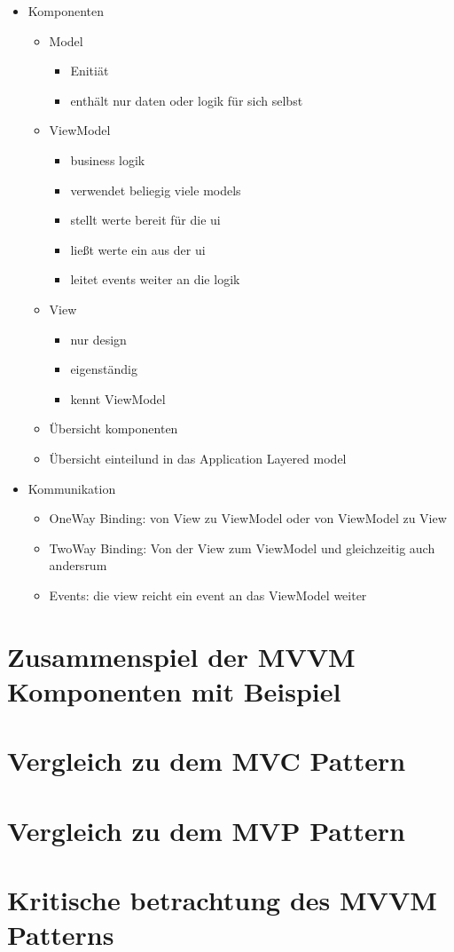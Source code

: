 \documentclass[titlepage=false,12pt]{scrreprt}
\begin{document}
	\begin{itemize}
		\item Komponenten
		\begin{itemize}
			\item Model
			\begin{itemize}
				\item Enitiät
				\item enthält nur daten oder logik für sich selbst
			\end{itemize}
			\item ViewModel
			\begin{itemize}
				\item business logik
				\item verwendet beliegig viele models
				\item stellt werte bereit für die ui
				\item ließt werte ein aus der ui
				\item leitet events weiter an die logik
			\end{itemize}
			\item View
			\begin{itemize}
				\item nur design
				\item eigenständig
				\item kennt ViewModel 
			\end{itemize}
			\item Übersicht komponenten
			\item Übersicht einteilund in das Application Layered model
		\end{itemize}
		\item Kommunikation
		\begin{itemize}
			\item OneWay Binding: von View zu ViewModel oder von ViewModel zu View
			\item TwoWay Binding: Von der View zum ViewModel und gleichzeitig auch andersrum
			\item Events: die view reicht ein event an das ViewModel weiter 
		\end{itemize}
	\end{itemize}

	


	\chapter{Zusammenspiel der MVVM Komponenten mit Beispiel}


	\chapter{Vergleich zu dem MVC Pattern}


	\chapter{Vergleich zu dem MVP Pattern}


	\chapter{Kritische betrachtung des MVVM Patterns}
\end{document}
